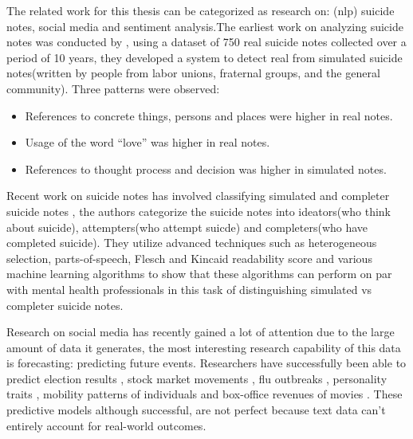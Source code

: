 The related work for this thesis can be categorized as research on: (nlp) suicide notes, social media and sentiment analysis.The earliest work on analyzing suicide notes was conducted by \cite{stone}, using a dataset of 750 real suicide notes collected over a period of 10 years,  they developed a system to detect real from simulated suicide notes(written by people from labor unions, fraternal groups, and the general community). Three patterns were observed:
\vspace{-0.2 mm}
\begin{itemize}
\itemsep-0.3em 
\item References to concrete things, persons and places were higher in real notes.
\item Usage of the word ``love'' was higher in real notes.
\item References to thought process and decision was higher in simulated notes.
\end{itemize} 
Recent work on suicide notes has involved classifying simulated and completer suicide notes \citep{pestinaetal2008,Pestian2}, the authors categorize the suicide notes into ideators(who think about suicide), attempters(who attempt suicde) and completers(who have completed suicide). They  utilize advanced techniques such as heterogeneous selection, parts-of-speech, Flesch and Kincaid readability score \citep{kincaid1975derivation} and various machine learning algorithms to show that these algorithms can perform on par with mental health professionals in this task of distinguishing simulated vs completer suicide notes.

Research on social media has recently gained a lot of attention due to the large amount of data it generates, the most interesting research capability of this data is forecasting: predicting future events. Researchers have successfully been able to predict election results \citep{gayo2013meta},  stock market movements \citep{bollen2011twitter}, flu outbreaks \citep{lampocris}, personality traits \citep{golbeck2011predicting},  mobility patterns of individuals \citep{song2010limits} and box-office revenues of movies \citep{asur2010predicting}. These predictive models although successful, are not perfect because text data can't entirely account for real-world outcomes. 

